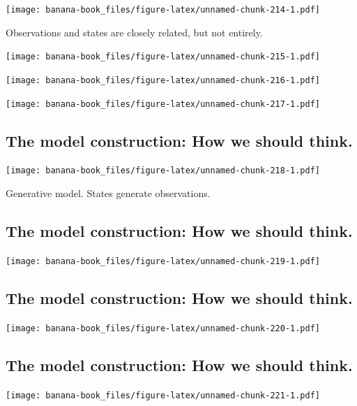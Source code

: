 \documentclass[
  12pt,
]{krantz}
\begin{document}
\texttt{[image: banana-book\_files/figure-latex/unnamed-chunk-214-1.pdf]}

Observations and states are closely related, but not entirely.

\texttt{[image: banana-book\_files/figure-latex/unnamed-chunk-215-1.pdf]}

\texttt{[image: banana-book\_files/figure-latex/unnamed-chunk-216-1.pdf]}

\texttt{[image: banana-book\_files/figure-latex/unnamed-chunk-217-1.pdf]}

\hypertarget{the-model-construction-how-we-should-think.}{%
\subsection{The model construction: How we should think.}\label{the-model-construction-how-we-should-think.}}

\texttt{[image: banana-book\_files/figure-latex/unnamed-chunk-218-1.pdf]}

Generative model. States generate observations.

\hypertarget{the-model-construction-how-we-should-think.-1}{%
\subsection{The model construction: How we should think.}\label{the-model-construction-how-we-should-think.-1}}

\texttt{[image: banana-book\_files/figure-latex/unnamed-chunk-219-1.pdf]}

\hypertarget{the-model-construction-how-we-should-think.-2}{%
\subsection{The model construction: How we should think.}\label{the-model-construction-how-we-should-think.-2}}

\texttt{[image: banana-book\_files/figure-latex/unnamed-chunk-220-1.pdf]}

\hypertarget{the-model-construction-how-we-should-think.-3}{%
\subsection{The model construction: How we should think.}\label{the-model-construction-how-we-should-think.-3}}

\texttt{[image: banana-book\_files/figure-latex/unnamed-chunk-221-1.pdf]}
\end{document}
